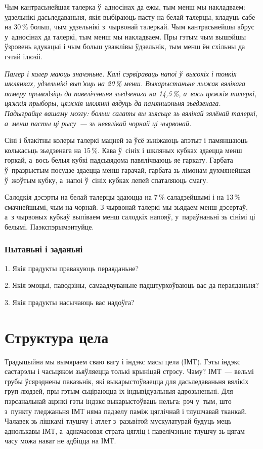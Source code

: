 Чым кантрасьнейшая талерка ў~адносінах да ежы, тым менш мы накладваем: удзельнікі дасьледаваньня, якія выбіраюць пасту на белай талерцы, кладуць сабе на 30\,\% больш, чым удзельнікі з~чырвонай талеркай. Чым кантрасьнейшы абрус у~адносінах да талеркі, тым менш мы накладваем. Пры гэтым чым вышэйшы ўзровень адукацыі і чым больш уважлівы ўдзельнік, тым менш ён схільны да гэтай ілюзіі.

\emph{Памер і колер маюць значэньне. Калі сэрвіраваць напоі ў~высокіх і тонкіх шклянках, удзельнікі вып'юць на 20\,\% менш. Выкарыстаньне лыжак вялікага памеру прыводзіць да павелічэньня зьедзенага на 14,5\,\%, а~вось цяжкія талеркі, цяжкія прыборы, цяжкія шклянкі вядуць да памяншэньня зьедзенага. Падыграйце вашаму мозгу: больш салаты вы зьясьце зь вялікай зялёнай талеркі, а~менш пасты ці рысу~--- зь невялікай чорнай ці чырвонай.}

Сіні і блакітны колеры талеркі мацней за ўсё зьніжаюць апэтыт і памяншаюць колькасьць зьедзенага на 15\,\%. Кава ў~сініх і шкляных кубках здаецца менш горкай, а~вось белыя кубкі падсьвядома павялічваюць яе гаркату. Гарбата ў~празрыстым посудзе здаецца менш гарачай, гарбата зь лімонам духмянейшая ў~жоўтым кубку, а~напоі ў~сініх кубках лепей спаталяюць смагу. 

Салодкія дэсэрты на белай талерцы здаюцца на 7\,\% саладзейшымі і на 13\,\% смачнейшымі, чым на чорнай. З чырвонай талеркі мы зьядаем менш дэсертаў, а~з чырвоных кубкаў выпіваем менш салодкіх напояў, у~параўнаньні зь сінімі ці белымі. Паэкспэрымэнтуйце.

\subsubsection{Пытаньні і заданьні}

1. Якія прадукты правакуюць пераяданьне?

2. Якія эмоцыі, паводзіны, самаадчуваньне падштурхоўваюць вас да пераяданьня?

3. Якія прадукты насычаюць вас надоўга?


\section{Структура цела}

Традыцыйна мы вымяраем сваю вагу і індэкс масы цела (ІМТ). Гэты індэкс састарэлы і часьцяком зьяўляецца толькі крыніцай стрэсу. Чаму? ІМТ~--- вельмі грубы ўсярэднены паказьнік, які выкарыстоўваецца для дасьледаваньня вялікіх груп людзей, пры гэтым сьціраюцца іх індывідуальныя адрозьненьні. Для пэрсанальнай ацэнкі гэты індэкс выкарыстоўваць нельга: рэч у~тым, што з~пункту гледжаньня ІМТ няма падзелу паміж цяглічнай і тлушчавай тканкай. Чалавек зь лішкамі тлушчу і атлет з~разьвітой мускулатурай будуць мець аднолькавы ІМТ, а~адначасовая страта цягліц і павелічэньне тлушчу зь цягам часу можа нават не адбіцца на ІМТ. 


